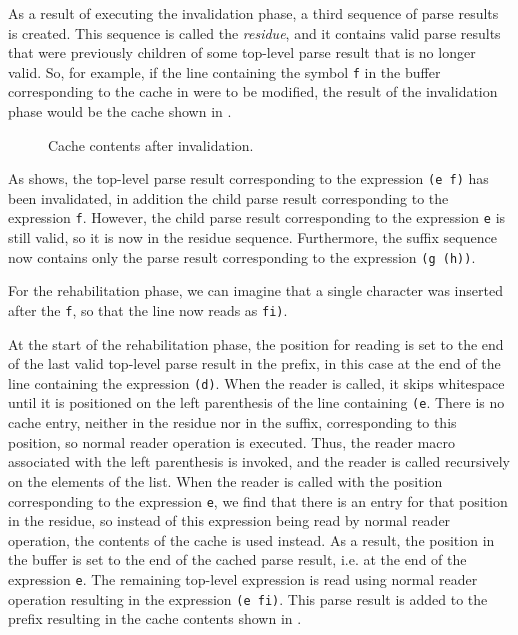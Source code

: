 As a result of executing the invalidation phase, a third sequence of
parse results is created.  This sequence is called the \emph{residue},
and it contains valid parse results that were previously children of
some top-level parse result that is no longer valid.  So, for example,
if the line containing the symbol \texttt{f} in the buffer
corresponding to the cache in  were to be modified,
the result of the invalidation phase would be the cache shown in
.

\begin{figure}
\begin{center}
\end{center}
\caption{\label{fig-after-invalidation}
Cache contents after invalidation.}
\end{figure}

As  shows, the top-level parse result
corresponding to the expression \texttt{(e f)} has been invalidated,
in addition the child parse result corresponding to the expression
\texttt{f}.  However, the child parse result corresponding to the
expression \texttt{e} is still valid, so it is now in the residue
sequence.  Furthermore, the suffix sequence now contains only the
parse result corresponding to the expression \texttt{(g (h))}.

For the rehabilitation phase, we can imagine that a single character
was inserted after the \texttt{f}, so that the line now reads as
\texttt{fi)}.

At the start of the rehabilitation phase, the position for reading is
set to the end of the last valid top-level parse result in the prefix,
in this case at the end of the line containing the expression
\texttt{(d)}.  When the reader is called, it skips whitespace until it
is positioned on the left parenthesis of the line containing
\texttt{(e}.  There is no cache entry, neither in the residue nor in
the suffix, corresponding to this position, so normal reader operation
is executed.  Thus, the reader macro associated with the left
parenthesis is invoked, and the reader is called recursively on the
elements of the list.  When the reader is called with the position
corresponding to the expression \texttt{e}, we find that there is an
entry for that position in the residue, so instead of this expression
being read by normal reader operation, the contents of the cache is
used instead.  As a result, the position in the buffer is set to the
end of the cached parse result, i.e. at the end of the expression
\texttt{e}.  The remaining top-level expression is read using normal
reader operation resulting in the expression \texttt{(e fi)}.  This
parse result is added to the prefix resulting in the cache contents
shown in .

